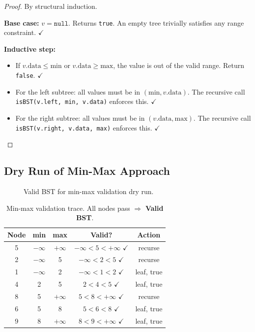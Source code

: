 \documentclass[10pt,journal,compsoc,onecolumn]{IEEEtran}
\begin{document}
\begin{proof}
By structural induction.

\textbf{Base case:} $v = \texttt{null}$. Returns \texttt{true}. An empty tree trivially satisfies any range constraint. $\checkmark$

\textbf{Inductive step:} 
\begin{itemize}
    \item If $v.\text{data} \leq \text{min}$ or $v.\text{data} \geq \text{max}$, the value is out of the valid range. Return \texttt{false}. $\checkmark$
    \item For the left subtree: all values must be in $(\text{min}, v.\text{data})$. The recursive call \texttt{isBST(v.left, min, v.data)} enforces this. $\checkmark$
    \item For the right subtree: all values must be in $(v.\text{data}, \text{max})$. The recursive call \texttt{isBST(v.right, v.data, max)} enforces this. $\checkmark$
\end{itemize}
\end{proof}

\subsection{Dry Run of Min-Max Approach}

\begin{figure}[htbp]
\centering
{}
\caption{Valid BST for min-max validation dry run.}
\end{figure}

\begin{table}[htbp]
\centering
\begin{tabular}{|c|c|c|c|c|}
\hline
\textbf{Node} & \textbf{min} & \textbf{max} & \textbf{Valid?} & \textbf{Action} \\
\hline
5 & $-\infty$ & $+\infty$ & $-\infty < 5 < +\infty$ $\checkmark$ & recurse \\
2 & $-\infty$ & 5 & $-\infty < 2 < 5$ $\checkmark$ & recurse \\
1 & $-\infty$ & 2 & $-\infty < 1 < 2$ $\checkmark$ & leaf, true \\
4 & 2 & 5 & $2 < 4 < 5$ $\checkmark$ & leaf, true \\
8 & 5 & $+\infty$ & $5 < 8 < +\infty$ $\checkmark$ & recurse \\
6 & 5 & 8 & $5 < 6 < 8$ $\checkmark$ & leaf, true \\
9 & 8 & $+\infty$ & $8 < 9 < +\infty$ $\checkmark$ & leaf, true \\
\hline
\end{tabular}
\caption{Min-max validation trace. All nodes pass $\Rightarrow$ \textbf{Valid BST}.}
\end{table}
\end{document}

